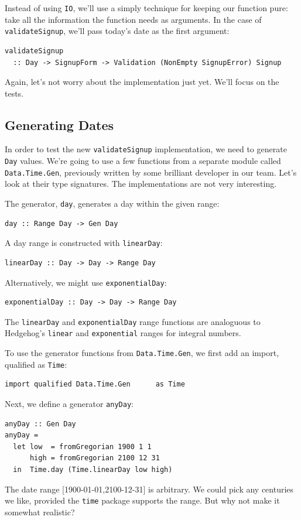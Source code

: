 Instead of using \texttt{IO}, we'll use a simply technique for keeping
our function pure: take all the information the function needs as
arguments. In the case of \texttt{validateSignup}, we'll pass today's
date as the first argument:

\begin{verbatim}
validateSignup
  :: Day -> SignupForm -> Validation (NonEmpty SignupError) Signup
\end{verbatim}
Again, let's not worry about the implementation just yet. We'll focus on
the tests.

\subsection{Generating Dates}\label{generating-dates}

In order to test the new \texttt{validateSignup} implementation, we need
to generate \texttt{Day} values. We're going to use a few functions from
a separate module called \texttt{Data.Time.Gen}, previously written by
some brilliant developer in our team. Let's look at their type
signatures. The implementations are not very interesting.

The generator, \texttt{day}, generates a day within the given range:

\begin{verbatim}
day :: Range Day -> Gen Day
\end{verbatim}
A day range is constructed with \texttt{linearDay}:

\begin{verbatim}
linearDay :: Day -> Day -> Range Day
\end{verbatim}
Alternatively, we might use \texttt{exponentialDay}:

\begin{verbatim}
exponentialDay :: Day -> Day -> Range Day
\end{verbatim}
The \texttt{linearDay} and \texttt{exponentialDay} range functions are
analoguous to Hedgehog's \texttt{linear} and \texttt{exponential} ranges
for integral numbers.

To use the generator functions from \texttt{Data.Time.Gen}, we first add
an import, qualified as \texttt{Time}:

\begin{verbatim}
import qualified Data.Time.Gen      as Time
\end{verbatim}
Next, we define a generator \texttt{anyDay}:

\begin{verbatim}
anyDay :: Gen Day
anyDay =
  let low  = fromGregorian 1900 1 1
      high = fromGregorian 2100 12 31
  in  Time.day (Time.linearDay low high)
\end{verbatim}
The date range [1900-01-01,2100-12-31]
is arbitrary. We could pick any centuries we like, provided the
\texttt{time} package supports the range. But why not make it somewhat
realistic?


